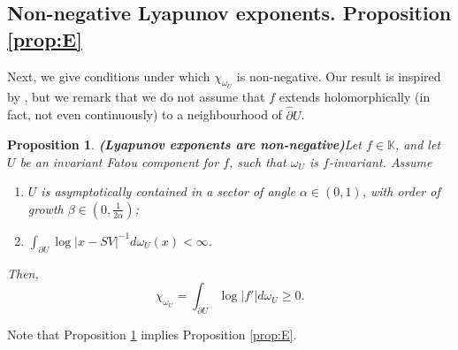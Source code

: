 \documentclass[11pt]{article}
\newtheorem{prop}[thm]{Proposition}
\theoremstyle{definition}
\theoremstyle{remark}
\theoremstyle{plain}
\begin{document}
\subsection{Non-negative Lyapunov exponents. Proposition \ref{prop:E}}\label{subsection-lyapunov-non-neg}
Next, we give conditions under which $ \chi_{\omega_U} $ is non-negative. Our result is inspired by \cite[Lemma 9.1.2, Corol. 9.1.3]{KotusUrbanski}, but we remark that we do not assume that $ f $ extends holomorphically (in fact, not even continuously)  to a neighbourhood of $ \widehat{\partial}U $.

\begin{prop}{\bf (Lyapunov exponents are non-negative)}\label{prop-lya-non-neg}
	Let $ f\in\mathbb{K} $, and let $ U $ be an invariant Fatou component for $ f $, such that $ \omega_U $ is $ f $-invariant. Assume\begin{enumerate}[label={\em (\alph*)}]
		\item $ U $ is asymptotically contained in a sector of angle $ \alpha\in \left( 0, 1\right) $, with order of growth $ \beta\in(0, \frac1{2\alpha}) $;
		\item\label{hipotesib} $ \int_{\partial U} \log\left| x-SV\right|^{-1} d\omega_U(x)<\infty  $.
	\end{enumerate}
	Then, \[\chi_{\omega_U}=\int_{\partial U}\log \left| f'\right| d\omega_U\geq 0.\]
\end{prop}

Note that Proposition \ref{prop-lya-non-neg} implies Proposition \ref{prop:E}.
\end{document}
